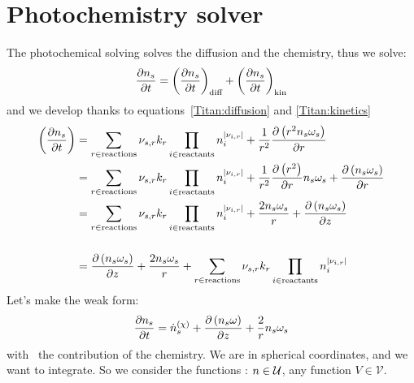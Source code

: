 \section{Photochemistry solver}

The photochemical solving solves the diffusion and the chemistry, thus we solve:
\begin{equation}
\frac{\partial n_s}{\partial t} = \left(\frac{\partial n_s}{\partial t}\right)_\text{diff} + \left(\frac{\partial n_s}{\partial t}\right)_\text{kin}
\end{equation}
and we develop thanks to equations~\ref{Titan:diffusion} and \ref{Titan:kinetics}
\begin{equation}
\begin{split}
\left(\frac{\partial n_s}{\partial t}\right) & = \sum_{r\in \text{reactions}} {\nu_{s,r}}k_{r} \prod_{i\in\text{reactants}}n_i^{|{\nu_{i,r}}|} +
                                     \frac{1}{r^2}\frac{\partial\left(r^2n_s\omega_s\right)}{\partial r} \\
                                 & = \sum_{r\in \text{reactions}} {\nu_{s,r}} k_r\prod_{i\in\text{reactants}}n_i^{|{\nu_{i,r}}|} +
                                     \frac{1}{r^2}\frac{\partial\left(r^2\right)}{\partial r}n_s\omega_s + \frac{\partial\left(n_s\omega_s\right)}{\partial r} \\
                                 & = \sum_{r\in \text{reactions}} {\nu_{s,r}} k_{r}\prod_{i\in\text{reactants}}n_i^{|{\nu_{i,r}}|} +
                                     \frac{2n_s\omega_s}{r} + \frac{\partial\left(n_s\omega_s\right)}{\partial z} \\[\baselineskip]
                                 & = \frac{\partial\left(n_s\omega_s\right)}{\partial z} + \frac{2n_s\omega_s}{r} + \sum_{r\in \text{reactions}} {\nu_{s,r}} k_{r}\prod_{i\in\text{reactants}}n_i^{|{\nu_{i,r}}|} 
\end{split}
\end{equation}
Let's make the weak form:
\begin{equation}
\frac{\partial n_s}{\partial t} = \dot{n}^{(\chi)}_s + \frac{\partial\left(n_s\omega\right)}{\partial z} + \frac{2}{r}n_s\omega_s
\end{equation}
with \omegadot\ the contribution of the chemistry.
We are in spherical coordinates, and we want to integrate.
So we consider the functions \conc:
$n \in \mathcal{U}$, any function $V \in \mathcal{V}$.
